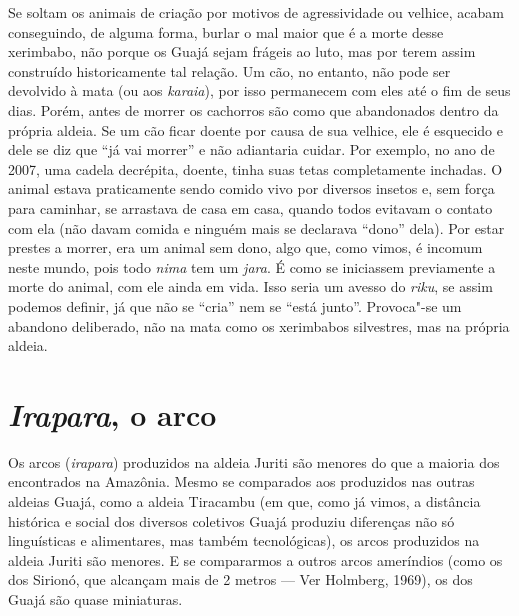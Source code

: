 Se soltam os animais de criação por motivos de agressividade ou velhice,
acabam conseguindo, de alguma forma, burlar o mal maior que é a morte
desse xerimbabo, não porque os Guajá sejam frágeis ao luto, mas por
terem assim construído historicamente tal relação. Um cão, no entanto,
não pode ser devolvido à mata (ou aos \emph{karaia}), por isso
permanecem com eles até o fim de seus dias. Porém, antes de morrer os
cachorros são como que abandonados dentro da própria aldeia. Se um cão
ficar doente por causa de sua velhice, ele é esquecido e dele se diz que
``já vai morrer'' e não adiantaria cuidar. Por exemplo, no ano de 2007,
uma cadela decrépita, doente, tinha suas tetas completamente inchadas. O
animal estava praticamente sendo comido vivo por diversos insetos e, sem
força para caminhar, se arrastava de casa em casa, quando todos evitavam
o contato com ela (não davam comida e ninguém mais se declarava ``dono''
dela). Por estar prestes a morrer, era um animal sem dono, algo que,
como vimos, é incomum neste mundo, pois todo \emph{nima} tem um
\emph{jara}. É como se iniciassem previamente a morte do animal, com ele
ainda em vida. Isso seria um avesso do \emph{riku}, se assim podemos
definir, já que não se ``cria'' nem se ``está junto''. Provoca"-se um
abandono deliberado, não na mata como os xerimbabos silvestres, mas na
própria aldeia.

\section{\emph{Irapara}, o arco}\label{irapara-o-arco}

Os arcos (\emph{irapara}) produzidos na aldeia Juriti são menores do que
a maioria dos encontrados na Amazônia. Mesmo se comparados aos
produzidos nas outras aldeias Guajá, como a aldeia Tiracambu (em que,
como já vimos, a distância histórica e social dos diversos coletivos
Guajá produziu diferenças não só linguísticas e alimentares, mas também
tecnológicas), os arcos produzidos na aldeia Juriti são menores. E se
compararmos a outros arcos ameríndios (como os dos Sirionó, que alcançam
mais de 2 metros --- Ver Holmberg, 1969), os dos Guajá são quase
miniaturas.

